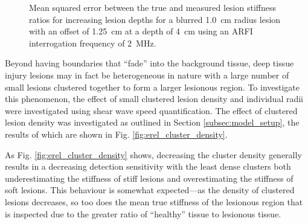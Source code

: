 			\begin{figure}[!htb]
				\centering
				\caption[Shear-wave speed quantified mean squared error related to lesion blurring]{Mean squared error between the true and measured lesion stiffness ratios for increasing lesion depths for a blurred \SI{1.0}{cm} radius lesion with an offset of \SI{1.25}{\cm} at a depth of \SI{4}{\cm} using an ARFI interrogation frequency of \SI{2}{\MHz}.}
				\label{fig:erel_blur_mse}
			\end{figure}

			Beyond having boundaries that ``fade'' into the background tissue, deep tissue injury lesions may in fact be heterogeneous in nature with a large number of small lesions clustered together to form a larger lesionous region. To investigate this phenomenon, the effect of small clustered lesion density and individual radii were investigated using shear wave speed quantification. The effect of clustered lesion density was investigated as outlined in Section \ref{subsec:model_setup}, the results of which are shown in Fig. \ref{fig:erel_cluster_density}.

			As Fig. \ref{fig:erel_cluster_density} shows, decreasing the cluster density generally results in a decreasing detection sensitivity with the least dense clusters both underestimating the stiffness of stiff lesions and overestimating the stiffness of soft lesions. This behaviour is somewhat expected---as the density of clustered lesions decreases, so too does the mean true stiffness of the lesionous region that is inspected due to the greater ratio of ``healthy'' tissue to lesionous tissue.

